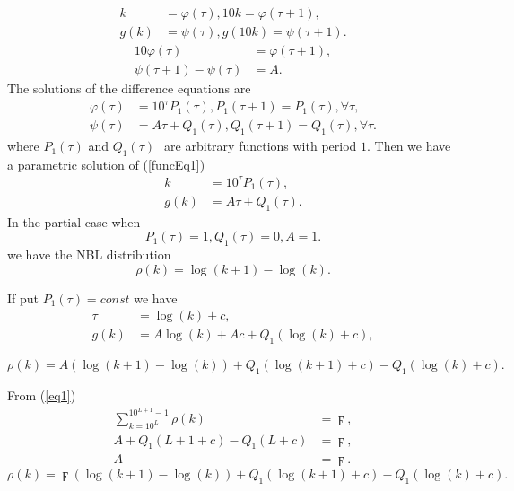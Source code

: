 \documentclass[titlepage,fleqn]{article}%
\begin{document}
\begin{align}
k  &  =\varphi(\tau),10k=\varphi(\tau+1),\label{Fun1}\\
g(k)  &  =\psi(\tau),g(10k)=\psi(\tau+1).\nonumber
\end{align}%
\begin{align}
10\varphi(\tau)  &  =\varphi(\tau+1),\label{Fun2}\\
\psi(\tau+1)-\psi(\tau)  &  =A.\nonumber
\end{align}
The solutions of the difference equations are%
\begin{align*}
\varphi(\tau)  &  =10^{\tau}P_{1}(\tau),P_{1}(\tau+1)=P_{1}(\tau),\forall
\tau,\\
\psi(\tau)  &  =A\tau+Q_{1}(\tau),Q_{1}(\tau+1)=Q_{1}(\tau),\forall\tau.
\end{align*}
where $P_{1}(\tau)$ and $Q_{1}(\tau)\ $\ are arbitrary functions with period
$1$. Then we have a parametric solution of (\ref{funcEq1})%
\begin{align}
k  &  =10^{\tau}P_{1}(\tau),\label{Param1}\\
g(k)  &  =A\tau+Q_{1}(\tau).\nonumber
\end{align}
In the partial case when
\[
P_{1}(\tau)=1,Q_{1}(\tau)=0,A=1.
\]
we have the NBL distribution%
\begin{equation}
\rho(k)=\log(k+1)-\log(k).
\end{equation}


If put $P_{1}(\tau)=const$ we have%
\begin{align*}
\tau &  =\log(k)+c,\\
g(k)  &  =A\log(k)+Ac+Q_{1}(\log(k)+c),
\end{align*}
%

\begin{equation}
\rho(k)=A\left(  \log(k+1)-\log(k)\right)  +Q_{1}(\log(k+1)+c)-Q_{1}%
(\log(k)+c). \label{SolK0}%
\end{equation}


From (\ref{eq1})
\begin{align}%
{\displaystyle\sum\limits_{k=10^{L}}^{10^{L+1}-1}}
\rho(k)  &  =\digamma,\\
A+Q_{1}(L+1+c)-Q_{1}(L+c)  &  =\digamma,\nonumber\\
A  &  =\digamma.\nonumber
\end{align}%
\begin{equation}
\rho(k)=\digamma\left(  \log(k+1)-\log(k)\right)  +Q_{1}(\log(k+1)+c)-Q_{1}%
(\log(k)+c). \label{SolK}%
\end{equation}
\end{document}
